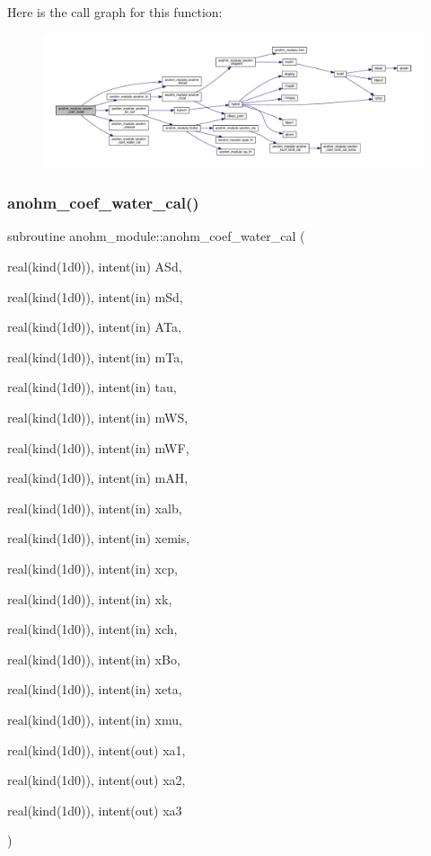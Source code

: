 Here is the call graph for this function\+:\nopagebreak
\begin{figure}[H]
\begin{center}
\leavevmode
\includegraphics[width=350pt]{namespaceanohm__module_a5b0b99ebb9db9ec50d904cc7a9802779_cgraph}
\end{center}
\end{figure}
\mbox{\label{namespaceanohm__module_aeb16132909e9aae5549d9ce6adcf389f}} 
\subsubsection{\texorpdfstring{anohm\+\_\+coef\+\_\+water\+\_\+cal()}{anohm\_coef\_water\_cal()}}
{\footnotesize\ttfamily subroutine anohm\+\_\+module\+::anohm\+\_\+coef\+\_\+water\+\_\+cal (\begin{DoxyParamCaption}\item[{real(kind(1d0)), intent(in)}]{A\+Sd,  }\item[{real(kind(1d0)), intent(in)}]{m\+Sd,  }\item[{real(kind(1d0)), intent(in)}]{A\+Ta,  }\item[{real(kind(1d0)), intent(in)}]{m\+Ta,  }\item[{real(kind(1d0)), intent(in)}]{tau,  }\item[{real(kind(1d0)), intent(in)}]{m\+WS,  }\item[{real(kind(1d0)), intent(in)}]{m\+WF,  }\item[{real(kind(1d0)), intent(in)}]{m\+AH,  }\item[{real(kind(1d0)), intent(in)}]{xalb,  }\item[{real(kind(1d0)), intent(in)}]{xemis,  }\item[{real(kind(1d0)), intent(in)}]{xcp,  }\item[{real(kind(1d0)), intent(in)}]{xk,  }\item[{real(kind(1d0)), intent(in)}]{xch,  }\item[{real(kind(1d0)), intent(in)}]{x\+Bo,  }\item[{real(kind(1d0)), intent(in)}]{xeta,  }\item[{real(kind(1d0)), intent(in)}]{xmu,  }\item[{real(kind(1d0)), intent(out)}]{xa1,  }\item[{real(kind(1d0)), intent(out)}]{xa2,  }\item[{real(kind(1d0)), intent(out)}]{xa3 }\end{DoxyParamCaption})}



